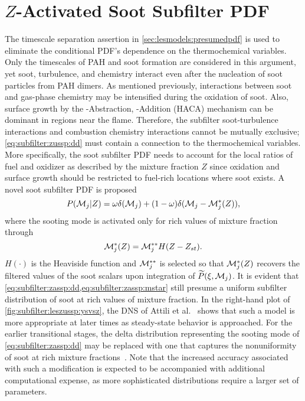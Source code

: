 \section{\texorpdfstring{$Z$}{Z}-Activated Soot Subfilter PDF}
\label{sec:subfilter:zassp}

The timescale separation assertion in \cref{sec:lesmodels:presumedpdf} is used to eliminate the conditional PDF's dependence on the thermochemical variables. Only the timescales of PAH and soot formation are considered in this argument, yet soot, turbulence, and chemistry interact even after the nucleation of soot particles from PAH dimers. As mentioned previously, interactions between soot and gas-phase chemistry may be intensified during the oxidation of soot. Also, surface growth by the -Abstraction, -Addition (HACA) mechanism can be dominant in regions near the flame. Therefore, the subfilter soot-turbulence interactions and combustion chemistry interactions cannot be mutually exclusive; \cref{eq:subfilter:zussp:dd} must contain a connection to the thermochemical variables. More specifically, the soot subfilter PDF needs to account for the local ratios of fuel and oxidizer as described by the mixture fraction $Z$ since oxidation and surface growth should be restricted to fuel-rich locations where soot exists. A novel soot subfilter PDF is proposed
\begin{equation}\label{eq:subfilter:zassp:dd}
  P(\mathcal{M}_j|Z) = \omega\delta(\mathcal{M}_j) + (1 - \omega)\delta(\mathcal{M}_j - \mathcal{M}_j^*(Z)),
\end{equation}
where the sooting mode is activated only for rich values of mixture fraction through
\begin{equation}\label{eq:subfilter:zassp:mstar}
  \mathcal{M}_j^*(Z) = \mathcal{M}_j^{**}H(Z - Z_{st}).
\end{equation}
$H(\cdot)$ is the Heaviside function and $\mathcal{M}_j^{**}$ is selected so that $\mathcal{M}_j^*(Z)$ recovers the filtered values of the soot scalars upon integration of $\widetilde{P}(\xi,\mathcal{M}_j)$. It is evident that \cref{eq:subfilter:zassp:dd,eq:subfilter:zassp:mstar} still presume a uniform subfilter distribution of soot at rich values of mixture fraction. In the right-hand plot of \cref{fig:subfilter:leszussp:ysvsz}, the DNS of Attili et al.~\cite{attili2014} shows that such a model is more appropriate at later times as steady-state behavior is approached. For the earlier transitional stages, the delta distribution representing the sooting mode of \cref{eq:subfilter:zassp:dd} may be replaced with one that captures the nonuniformity of soot at rich mixture fractions~\cite{berger2017}. Note that the increased accuracy associated with such a modification is expected to be accompanied with additional computational expense, as more sophisticated distributions require a larger set of parameters.

